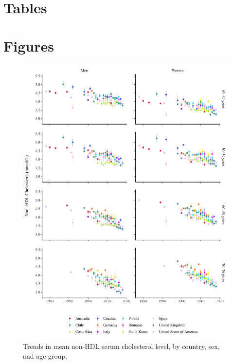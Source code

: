 \documentclass[12pt]{article}
\begin{document}
\singlespacing



\clearpage

\onehalfspacing

\section*{Tables} \label{sec:tab}



\clearpage

\section*{Figures} \label{sec:fig}

\begin{figure}[hp]
 \centering
 \includegraphics[width=\textwidth]{../3_figures/fig1_mean_chol.pdf}
 \caption{Trends in mean non-HDL serum cholesterol level, by country, sex, and age group.}
 \label{fig:mean_chol}
\end{figure}
\end{document}
